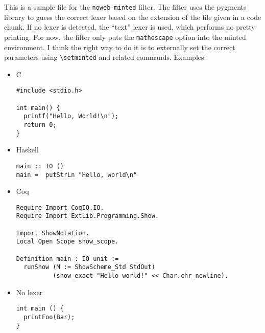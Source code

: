 \documentclass{article}
\begin{document}
This is a sample file for the {\tt{}noweb-minted} filter. The filter uses
the pygments library to guess the correct lexer based on the extension
of the file given in a code chunk. If no lexer is detected, the
``text'' lexer is used, which performs no pretty printing. For now,
the filter only puts the {\tt mathescape} option into the minted
environment. I think the right way to do it is to externally set the
correct parameters using {\tt \textbackslash{setminted}} and related
commands. Examples:

\begin{itemize}
\item C

\endmoddef
\begin{verbatim}
#include <stdio.h>

int main() {
  printf("Hello, World!\n");
  return 0;
}

\end{verbatim}
\nwdocspar

\item Haskell

\nwenddocs{}\endmoddef
\begin{verbatim}
main :: IO ()
main =  putStrLn "Hello, world\n"

\end{verbatim}
\nwdocspar

\item Coq

\nwenddocs{}\endmoddef
\begin{verbatim}
Require Import CoqIO.IO.
Require Import ExtLib.Programming.Show.

Import ShowNotation.
Local Open Scope show_scope.

Definition main : IO unit :=
  runShow (M := ShowScheme_Std StdOut)
          (show_exact "Hello world!" << Char.chr_newline).

\end{verbatim}
\nwdocspar

\item No lexer

\nwenddocs{}\endmoddef
\begin{verbatim}
int main () {
  printFoo(Bar);
}

\end{verbatim}
\nwdocspar

\end{itemize}
\end{document}
